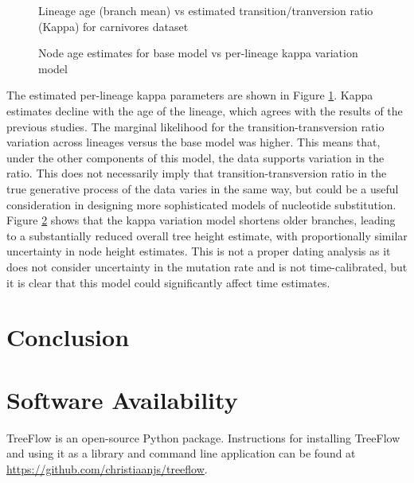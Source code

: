 \begin{figure}
    \centering
    \caption{Lineage age (branch mean) vs estimated transition/tranversion ratio (Kappa) for carnivores dataset}
    \label{fig:carnivoreskappa}
\end{figure}

\begin{figure}
    \centering
    \caption{Node age estimates for base model vs per-lineage kappa variation model}
    \label{fig:carnivorestree}
\end{figure}


The estimated per-lineage kappa parameters are shown in Figure \ref{fig:carnivoreskappa}. Kappa estimates decline with the age of the lineage, which agrees with the results of the previous studies. The marginal likelihood for the transition-transversion ratio variation across lineages versus the base model was higher. This means that, under the other components of this model, the data supports variation in the ratio. This does not necessarily imply that transition-transversion ratio in the true generative process of the data varies in the same way, but could be a useful consideration in designing more sophisticated models of nucleotide substitution. Figure \ref{fig:carnivorestree} shows that the kappa variation model shortens older branches, leading to a substantially reduced overall tree height estimate, with proportionally similar uncertainty in node height estimates. This is not a proper dating analysis as it does not consider uncertainty in the mutation rate and is not time-calibrated, but it is clear that this model could significantly affect time estimates.




\section{Conclusion}



\section{Software Availability}

TreeFlow is an open-source Python package. Instructions for installing TreeFlow and using it as a library and command line application can be found at \url{https://github.com/christiaanjs/treeflow}.

